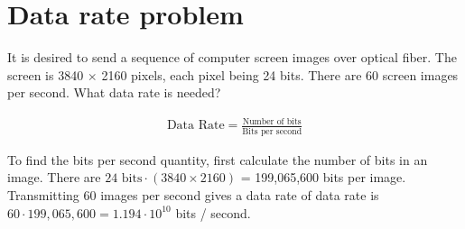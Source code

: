 
\section{Data rate problem}
It is desired to send a sequence of computer screen images over optical fiber. The screen is 3840 $\times$ 2160 pixels, each pixel being 24 bits. There are 60 screen images per second. What data rate is needed?

\begin{align*}
	\text{Data Rate} = \frac{\text{Number of bits}}{\text{Bits per second}}
\end{align*}

To find the bits per second quantity, first calculate the number of bits in an image. There are $24 \text{ bits} \cdot (3840 \times 2160)$ = 199,065,600 bits per image. Transmitting 60 images per second gives a data rate of data rate is $60 \cdot 199,065,600 = 1.194 \cdot 10^{10}$ bits / second.

\section{}
\section{}
\section{}
\section{}
\section{}
\section{}
